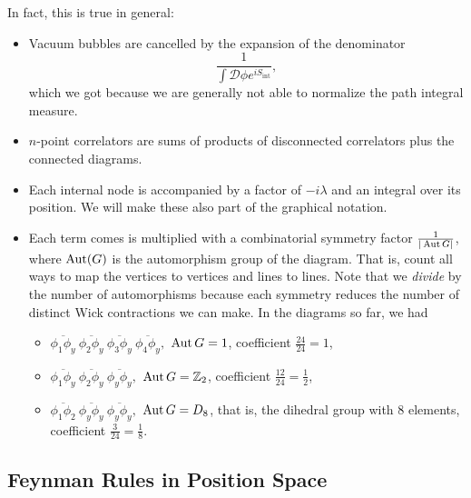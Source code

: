 \documentclass[12pt]{article}
\begin{document}
In fact, this is true in general:
\begin{itemize}
\item Vacuum bubbles are cancelled by the expansion of the denominator 
  \begin{equation}
    \frac{1}{\int \mathcal{D}\phi e^{iS_\text{int}}},
  \end{equation}
  which we got because we are generally not able to normalize the path
  integral measure.
\item $n$-point correlators are sums of products of disconnected
  correlators plus the connected diagrams.
\item Each internal node is accompanied by a factor of $-i\lambda$ and
  an integral over its position. We will make these also part of the
  graphical notation.
\item Each term comes is multiplied with a combinatorial symmetry
  factor $\frac{1}{|\operatorname{Aut} G|}$, where $\operatorname{Aut}(G)$ is the automorphism
  group of the diagram. That is, count all ways to map the vertices to
  vertices and lines to lines. Note that we \emph{divide} by the
  number of automorphisms because each symmetry reduces the number of
  distinct Wick contractions we can make. In the diagrams so far, we had
  \begin{itemize}
  \item
    \begin{math}
      \overline{\phi_1 \phi_y}~
      \overline{\phi_2 \phi_y}~
      \overline{\phi_3 \phi_y}~
      \overline{\phi_4 \phi_y},
    \end{math}
    $\operatorname{Aut} G = 1$, coefficient $\tfrac{24}{24} = 1$,
  \item 
    \begin{math}
      \overline{\phi_1 \phi_y}~
      \overline{\phi_2 \phi_y}~
      \overline{\phi_y \phi_y},
    \end{math}
    $\operatorname{Aut} G = \mathbb{Z}_2$, coefficient $\tfrac{12}{24} = \tfrac{1}{2}$,
  \item 
    \begin{math}
      \overline{\phi_1 \phi_2}~
      \overline{\phi_y \phi_y}~
      \overline{\phi_y \phi_y},
    \end{math}
    $\operatorname{Aut} G = D_8$, that is, the dihedral group with $8$ elements,
    coefficient $\tfrac{3}{24} = \tfrac{1}{8}$.
  \end{itemize}
\end{itemize}


\subsection{Feynman Rules in Position Space}
\end{document}
